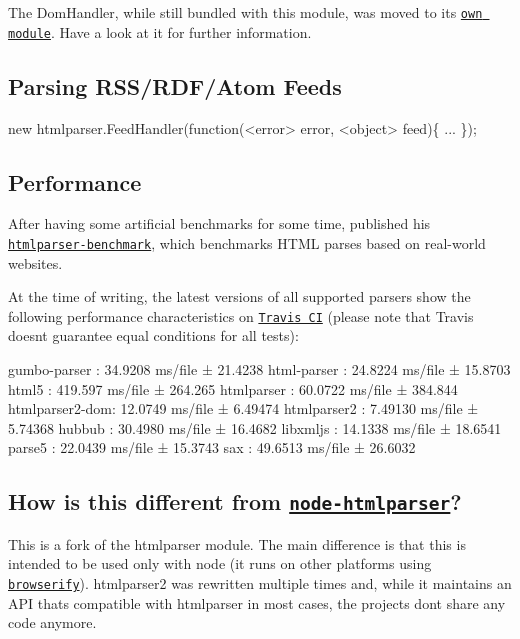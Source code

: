 The {\ttfamily Dom\+Handler}, while still bundled with this module, was moved to its \href{https://github.com/fb55/domhandler}{\tt own module}. Have a look at it for further information.

\subsection*{Parsing R\+S\+S/\+R\+D\+F/\+Atom Feeds}


\begin{DoxyCode}
new htmlparser.FeedHandler(function(<error> error, <object> feed)\{
    ...
\});
\end{DoxyCode}


\subsection*{Performance}

After having some artificial benchmarks for some time, {\bfseries } published his \href{https://github.com/AndreasMadsen/htmlparser-benchmark}{\tt {\ttfamily htmlparser-\/benchmark}}, which benchmarks H\+T\+ML parses based on real-\/world websites.

At the time of writing, the latest versions of all supported parsers show the following performance characteristics on \href{https://travis-ci.org/AndreasMadsen/htmlparser-benchmark/builds/10805007}{\tt Travis CI} (please note that Travis doesn\textquotesingle{}t guarantee equal conditions for all tests)\+:


\begin{DoxyCode}
gumbo-parser   : 34.9208 ms/file ± 21.4238
html-parser    : 24.8224 ms/file ± 15.8703
html5          : 419.597 ms/file ± 264.265
htmlparser     : 60.0722 ms/file ± 384.844
htmlparser2-dom: 12.0749 ms/file ± 6.49474
htmlparser2    : 7.49130 ms/file ± 5.74368
hubbub         : 30.4980 ms/file ± 16.4682
libxmljs       : 14.1338 ms/file ± 18.6541
parse5         : 22.0439 ms/file ± 15.3743
sax            : 49.6513 ms/file ± 26.6032
\end{DoxyCode}


\subsection*{How is this different from \href{https://github.com/tautologistics/node-htmlparser}{\tt node-\/htmlparser}?}

This is a fork of the {\ttfamily htmlparser} module. The main difference is that this is intended to be used only with node (it runs on other platforms using \href{https://github.com/substack/node-browserify}{\tt browserify}). {\ttfamily htmlparser2} was rewritten multiple times and, while it maintains an A\+PI that\textquotesingle{}s compatible with {\ttfamily htmlparser} in most cases, the projects don\textquotesingle{}t share any code anymore.

